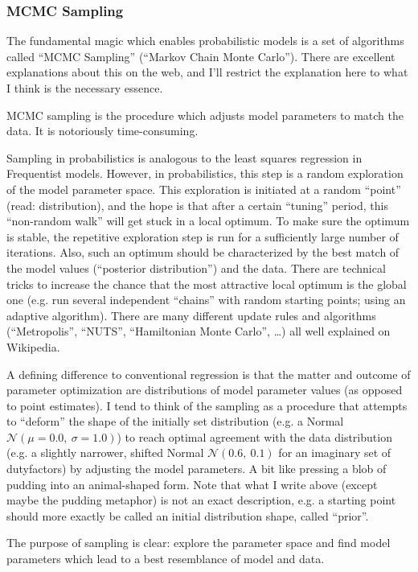 \subsubsection{MCMC Sampling}
\label{workflow:sampling}
The fundamental magic which enables probabilistic models is a set of algorithms called ``MCMC Sampling'' (``Markov Chain Monte Carlo'').
There are excellent explanations about this on the web, and I'll restrict the explanation here to what I think is the necessary essence.

MCMC sampling is the procedure which adjusts model parameters to match the data.
It is notoriously time-consuming.

Sampling in probabilistics is analogous to the least squares regression in Frequentist models.
However, in probabilistics, this step is a random exploration of the model parameter space.
This exploration is initiated at a random ``point'' (read: distribution), and the hope is that after a certain ``tuning'' period, this ``non-random walk'' will get stuck in a local optimum.
To make sure the optimum is stable, the repetitive exploration step is run for a sufficiently large number of iterations.
Also, such an optimum should be characterized by the best match of the model values (``posterior distribution'') and the data.
There are technical tricks to increase the chance that the most attractive local optimum is the global one (e.g. run several independent ``chains'' with random starting points; using an adaptive algorithm).
There are many different update rules and algorithms (``Metropolis'', ``NUTS'', ``Hamiltonian Monte Carlo'', \ldots{}) all well explained on Wikipedia.

A defining difference to conventional regression is that the matter and outcome of parameter optimization are distributions of model parameter values (as opposed to point estimates).
I tend to think of the sampling as a procedure that attempts to ``deform'' the shape of the initially set distribution (e.g. a Normal \(\mathcal{{N}}\left(\mu = 0.0,\ \sigma = 1.0\right)\)) to reach optimal agreement with the data distribution (e.g. a slightly narrower, shifted Normal \(\mathcal{{N}}\left(0.6,\ 0.1\right)\) for an imaginary set of dutyfactors) by adjusting the model parameters.
A bit like pressing a blob of pudding into an animal-shaped form.
Note that what I write above (except maybe the pudding metaphor) is not an exact description, e.g. a starting point should more exactly be called an initial distribution shape, called ``prior''.

The purpose of sampling is clear: explore the parameter space and find model parameters which lead to a best resemblance of model and data.


